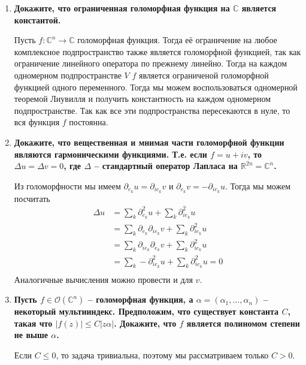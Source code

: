 \documentclass{article}
\begin{document}
\begin{enumerate}
    \item \textbf{Докажите, что ограниченная голоморфная функция на $\mathbb C$
        является константой.}

        Пусть $f:\mathbb{C}^n\rightarrow\mathbb{C}$ голоморфная функция. Тогда
        её ограничение на любое комплексное подпространство также является
        голоморфной функцией, так как ограничение линейного оператора по прежнему
        линейно. Тогда на каждом одномерном подпространстве $V$ $f$ является
        ограниченой голоморфной функцией одного переменного. Тогда мы можем
        воспользоваться одномерной теоремой Лиувилля и получить константность
        на каждом одномерном подпространстве. Так как все эти подпространства
        пересекаются в нуле, то вся функция $f$ постоянна.

    \item \textbf{Докажите, что вещественная и мнимая части голоморфной
        функции являются гармоническими функциями. Т.е. если $f=u+iv$, то 
        $\Delta u=\Delta v=0$, где $\Delta$ – стандартный оператор Лапласа на $\mathbb R^{2n}=
        \mathbb C^n$.}

        Из голоморфности мы имеем $\partial_{e_k}u=\partial_{ie_k}v$ и
        $\partial_{e_k}v=-\partial_{ie_k}u$. Тогда мы можем посчитать
        \begin{align*}
            \Delta u&=\sum_k \partial_{e_k}^2u+\sum_k \partial_{ie_k}^2u\\
            &=\sum_k \partial_{e_k}\partial_{ie_k}v+\sum_k \partial_{ie_k}^2u\\
            &=\sum_k \partial_{ie_k}\partial_{e_k}v+\sum_k \partial_{ie_k}^2u\\
            &=\sum_k -\partial_{ie_k}^2u+\sum_k \partial_{ie_k}^2u=0\\
        \end{align*}
        Аналогичные вычисления можно провести и для $v$.

    \item \textbf{Пусть $f\in\mathcal{O}(\mathbb{C}^n)$ – голоморфная функция,
        а $\alpha=(\alpha_1,\ldots,\alpha_n)$ – некоторый мультииндекс.
        Предположим, что существует константа $C$, такая что $|f(z)|\leq C|zα|$.
        Докажите, что $f$ является полиномом степени не выше $\alpha$.}

        Если $C\leq 0$, то задача тривиальна, поэтому мы рассматриваем только
        $C>0$.


\end{enumerate}
\end{document}
